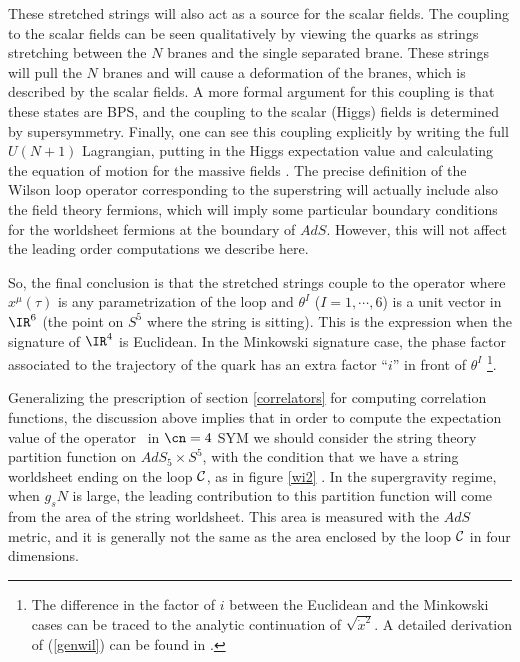 These stretched strings will also act as a source for the scalar
fields. The coupling to the scalar fields can be seen qualitatively by
viewing the quarks as strings stretching between the $N$ branes and
the single separated brane. These strings will pull the $N$ branes and
will cause a deformation of the branes, which is described by the
scalar fields.  A more formal argument for this coupling is that these
states are BPS, and the coupling to the scalar (Higgs) fields is
determined by supersymmetry.  Finally, one can see this coupling
explicitly by writing the full $U(N+1)$ Lagrangian, putting in the
Higgs expectation value and calculating the equation of motion for the
massive fields
\cite{Maldacena:1998im}.
The precise definition of the Wilson loop operator corresponding to
the superstring will actually include also the field theory fermions,
which will imply some particular boundary conditions for the
worldsheet fermions at the boundary of $AdS$. However, this will not
affect the leading order computations we describe here.

So, the final conclusion is that the stretched strings
couple to the operator
where $x^\mu(\tau)$ is any parametrization of the loop and
$\theta^I$ ($I=1,\cdots,6$) is a unit vector in $\IR^6$ (the point on
$S^5$ where the string is sitting). This is the expression when
the signature of $\IR^4$ is Euclidean. In the Minkowski signature
case, the phase factor associated to the trajectory of the quark
has an extra factor ``$i$'' in front 
of $\theta^I$ \footnote{The difference
in the factor of $i$ between the Euclidean and the Minkowski cases
can be traced to the analytic continuation of 
$\sqrt{\dot x^2}$. A detailed derivation of (\ref{genwil})
can be found in \cite{Drukker:1999zq}.}. 

Generalizing the prescription of section \ref{correlators} for computing
correlation functions, the discussion above implies that in order to
compute the expectation value of the operator \genwil\ in $\cn=4$ SYM
we should consider the string theory partition function on
$AdS_5\times S^5$, with the condition that we have a string worldsheet
ending on the loop ${\cal C}$, as in figure
\ref{wi2} \cite{Rey:1998ik,Maldacena:1998im}.
In the supergravity regime, when $g_s N$ is large, the leading
contribution to this partition function will come from the area of the
string worldsheet. This area is measured with the $AdS$ metric, and it
is generally not the same as the area enclosed by the loop ${\cal
C}$ in four dimensions.


